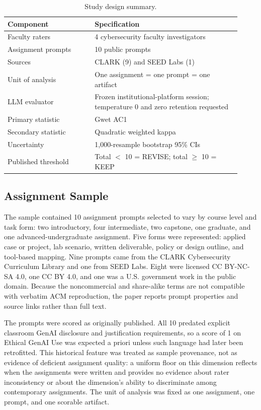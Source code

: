 \documentclass[sigconf]{acmart}
\begin{document}
\begin{table}[t]
\caption{Study design summary.}
\label{tab:design}
\begin{tabular}{@{}p{0.34\linewidth}p{0.58\linewidth}@{}}
\toprule
Component & Specification \\
\midrule
Faculty raters & 4 cybersecurity faculty investigators \\
Assignment prompts & 10 public prompts \\
Sources & CLARK (9) and SEED Labs (1) \\
Unit of analysis & One assignment = one prompt = one artifact \\
LLM evaluator & Frozen institutional-platform session; temperature 0 and zero retention requested \\
Primary statistic & Gwet AC1 \\
Secondary statistic & Quadratic weighted kappa \\
Uncertainty & 1,000-resample bootstrap 95\% CIs \\
Published threshold & Total $<$ 10 = REVISE; total $\geq$ 10 = KEEP \\
\bottomrule
\end{tabular}
\end{table}

\subsection{Assignment Sample}
The sample contained 10 assignment prompts selected to vary by course level and task form: two introductory, four intermediate, two capstone, one graduate, and one advanced-undergraduate assignment. Five forms were represented: applied case or project, lab scenario, written deliverable, policy or design outline, and tool-based mapping. Nine prompts came from the CLARK Cybersecurity Curriculum Library and one from SEED Labs. Eight were licensed CC BY-NC-SA 4.0, one CC BY 4.0, and one was a U.S. government work in the public domain. Because the noncommercial and share-alike terms are not compatible with verbatim ACM reproduction, the paper reports prompt properties and source links rather than full text.

The prompts were scored as originally published. All 10 predated explicit classroom GenAI disclosure and justification requirements, so a score of 1 on Ethical GenAI Use was expected a priori unless such language had later been retrofitted. This historical feature was treated as sample provenance, not as evidence of deficient assignment quality: a uniform floor on this dimension reflects when the assignments were written and provides no evidence about rater inconsistency or about the dimension's ability to discriminate among contemporary assignments. The unit of analysis was fixed as one assignment, one prompt, and one scorable artifact.
\end{document}
